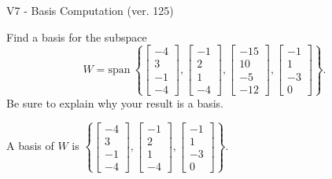 \begin{exercise}
  \begin{exerciseTitle}V7 - Basis Computation (ver. 125)\end{exerciseTitle}
  \begin{exerciseStatement}
    Find a basis for the subspace 
\[W=\mathrm{span}\ \left\{\left[\begin{array}{r}
-4 \\
3 \\
-1 \\
-4
\end{array}\right] , \left[\begin{array}{r}
-1 \\
2 \\
1 \\
-4
\end{array}\right] , \left[\begin{array}{r}
-15 \\
10 \\
-5 \\
-12
\end{array}\right] , \left[\begin{array}{r}
-1 \\
1 \\
-3 \\
0
\end{array}\right]\right\}.\]
 Be sure to explain why your result is a basis.


  \end{exerciseStatement}
  \begin{exerciseAnswer}
   A basis of \(W\) is  \(\left\{\left[\begin{array}{r}
-4 \\
3 \\
-1 \\
-4
\end{array}\right] , \left[\begin{array}{r}
-1 \\
2 \\
1 \\
-4
\end{array}\right] , \left[\begin{array}{r}
-1 \\
1 \\
-3 \\
0
\end{array}\right]\right\}\).
  


  \end{exerciseAnswer}
\end{exercise}